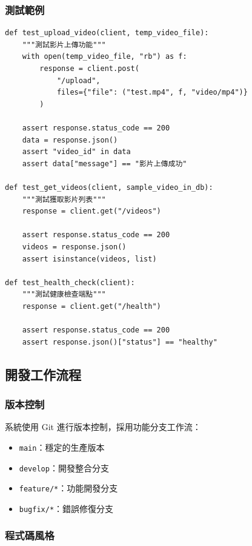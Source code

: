 \documentclass[a4paper,14pt,oneside]{article}
\begin{document}
\subsubsection{測試範例}

\begin{lstlisting}[style=pythonstyle, caption={API 端點測試範例}]
def test_upload_video(client, temp_video_file):
    """測試影片上傳功能"""
    with open(temp_video_file, "rb") as f:
        response = client.post(
            "/upload",
            files={"file": ("test.mp4", f, "video/mp4")}
        )

    assert response.status_code == 200
    data = response.json()
    assert "video_id" in data
    assert data["message"] == "影片上傳成功"

def test_get_videos(client, sample_video_in_db):
    """測試獲取影片列表"""
    response = client.get("/videos")

    assert response.status_code == 200
    videos = response.json()
    assert isinstance(videos, list)

def test_health_check(client):
    """測試健康檢查端點"""
    response = client.get("/health")

    assert response.status_code == 200
    assert response.json()["status"] == "healthy"
\end{lstlisting}

\subsection{開發工作流程}

\subsubsection{版本控制}

系統使用 Git 進行版本控制，採用功能分支工作流：

\begin{itemize}
    \item \texttt{main}：穩定的生產版本
    \item \texttt{develop}：開發整合分支
    \item \texttt{feature/*}：功能開發分支
    \item \texttt{bugfix/*}：錯誤修復分支
\end{itemize}

\subsubsection{程式碼風格}
\end{document}
